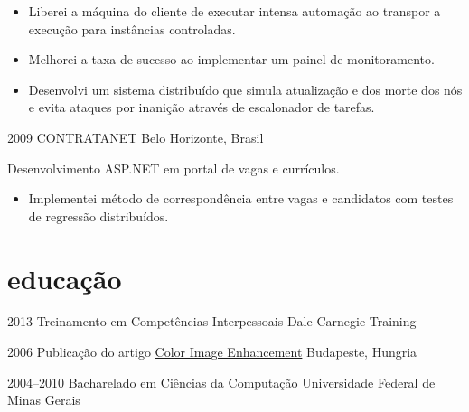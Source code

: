 \documentclass[]{friggeri-cv}
\begin{document}
\begin{entrylist}
{  \begin{itemize}
    \item Liberei a máquina do cliente de executar intensa automação ao transpor a execução para instâncias controladas.
    \item Melhorei a taxa de sucesso ao implementar um painel de monitoramento.
    \item Desenvolvi um sistema distribuído que simula atualização e dos morte dos nós e evita ataques por inanição através de escalonador de tarefas.
  \end{itemize}
}

\entry
{2009}
{CONTRATANET}
{Belo Horizonte, Brasil}
{ Desenvolvimento ASP.NET em portal de vagas e currículos.
\begin{itemize}
  \item Implementei método de correspondência entre vagas e candidatos com testes de regressão distribuídos.
  \end{itemize}
}

\end{entrylist}

\section{educação}
\begin{entrylist}
	\entry
	{2013}
	{{\normalfont Treinamento em} Competências Interpessoais}
	{Dale Carnegie Training}
	
	\entry
	{2006}
	{{\normalfont Publicação do artigo}  \href{http://goo.gl/iwGso6}{Color Image Enhancement}}
	{Budapeste, Hungria}

	\entry
	{2004--2010}
	{{\normalfont Bacharelado em} Ciências da Computação}
	{Universidade Federal de Minas Gerais}
	
\end{entrylist}
\end{document}
